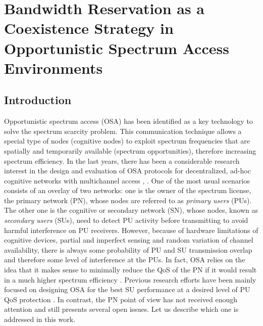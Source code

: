 \graphicspath{ {img/BR/} }
\chapter[Bandwidth Reservation as a Coexistence Strategy in Opportunistic Spectrum Access Environments][Bandwidth Reservation in OSA]{Bandwidth Reservation as a Coexistence Strategy in Opportunistic Spectrum Access Environments}\label{BR_chap}
\section{Introduction}\label{sec:Introduction}
Opportunistic spectrum access (OSA) has been identified as a key technology to solve the spectrum scarcity problem. This communication technique allows a special type of nodes (cognitive nodes) to exploit spectrum frequencies that are spatially and temporarily available (spectrum opportunities), therefore increasing spectrum efficiency.
In the last years, there has been a considerable research interest in the design and evaluation of OSA protocols for decentralized, ad-hoc cognitive networks with multichannel access \cite{ref:SurveyMACs},  \cite{ref:comparativaMAC}.
One of the most usual scenarios consists of an overlay of two networks: one is the owner of the spectrum license, the primary network (PN), whose nodes are referred to as \textit{primary users} (PUs). The other one is the cognitive or secondary network (SN), whose nodes, known as \textit{secondary users} (SUs), need to detect PU activity before transmitting to avoid harmful interference on PU receivers.
However, because of hardware limitations of cognitive devices, partial and imperfect sensing and random variation of channel availability, there is always some probability of PU and SU transmission overlap and therefore some level of interference at the PUs.
In fact, OSA relies on the idea that it makes sense to minimally reduce the QoS of the PN if it would result in a much higher spectrum efficiency \cite{ref:comparativaMAC}.
Previous research efforts have been mainly focused on designing OSA for the best SU performance at a desired level of PU QoS protection \cite{ref:SurveyMACs}. In contrast, the PN point of view has not received enough attention and still presents several open issues. Let us describe which one is addressed in this work. 

